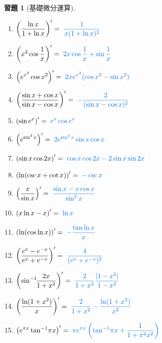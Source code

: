 \documentclass[12pt]{extarticle}
\newcommand{\ds}{\displaystyle}
\theoremstyle{definition}
\newtheorem*{exe}{習題}
\begin{document}
\begin{exe}[基礎微分運算]
\begin{multicols}{2}
\begin{enumerate}
      \item $\ds\left(\frac{\ln x}{1 + \ln x}\right)' = {\color{C2}\;\frac{1}{x(1 + \ln x)^2}}$
      \item $\ds\left(x^2\cos\frac{1}{x}\right)' = {\color{C2}\;2x\cos\frac{1}{x} + \sin\frac{1}{x}}$
      \item $\ds\left(e^{x^2}\cos x^2\right)' = {\color{C2}\;2xe^{x^2}(\cos x^2 - \sin x^2)}$
      \item $\ds\left(\frac{\sin x + \cos x}{\sin x - \cos x}\right)' = {\color{C2}\;-\frac{2}{(\sin x - \cos x)^2}}$
      \item $\ds\left(\sin e^x\right)' = {\color{C2}\;e^x \cos e^x}$
      \item $\ds\left(e^{\sin^2x}\right)' = {\color{C2}\;2e^{\sin^2x}\sin x\cos x}$
      \item $\ds\left(\sin x\cos2x\right)' = {\color{C2}\;\cos x\cos2x - 2\sin x\sin2x}$
      \item $\ds\left(\ln(\csc x + \cot x)\right)' = {\color{C2}\;-\csc x}$
      \item $\ds\left(\frac{x}{\sin x}\right)' = {\color{C2}\;\frac{\sin x - x\cos x}{\sin^2x}}$
      \item $\ds\left(x \ln x - x\right)' = {\color{C2}\;\ln x}$
      \item $\ds\left(\ln(\cos\ln x)\right)' = {\color{C2}\;-\frac{\tan\ln x}{x}}$
      \item $\ds\left(\frac{e^x - e^{-x}}{e^x + e^{-x}}\right)' = {\color{C2}\;\frac{4}{(e^x + e^{-x})^2}}$
      \item $\ds\left(\sin^{-1}\!\!\frac{2x}{1 + x^2}\right)' = {\color{C2}\;\frac{2}{1 + x^2}\frac{|1 - x^2|}{1 - x^2}}$
      \item $\ds\left(\frac{\ln(1 + x^2)}{x}\right)' = {\color{C2}\;\frac{2}{1 + x^2} - \frac{\ln(1 + x^2)}{x^2}}$
      \item $\ds\left(e^{\pi x}\tan^{-1}\!\pi x\right)' = {\color{C2}\;\pi e^{\pi x}\left(\tan^{-1}\!\pi x + \frac{1}{1 + \pi^2 x^2}\right)}$
    \end{enumerate} 
  \end{multicols}
\end{exe}

%
%
\end{document}
